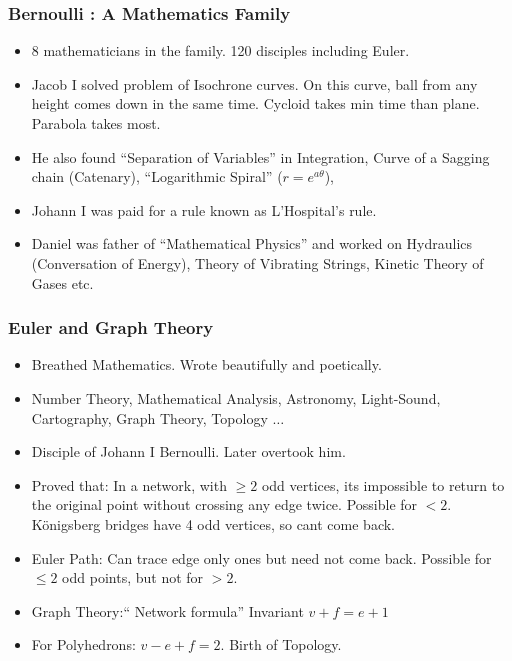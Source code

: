 \begin{frame}[fragile]
\frametitle{Bernoulli : A Mathematics Family}



\begin{itemize}
\item 8 mathematicians in the family. 120 disciples including Euler.
\item Jacob I solved problem of Isochrone curves. On this curve, ball from any height comes down in the same time. Cycloid takes min time than plane. Parabola takes most.
\item He also found ``Separation of Variables'' in Integration, Curve of a Sagging chain (Catenary), ``Logarithmic Spiral'' ($r=e^{a\theta}$),
\item Johann I was paid for a rule known as L'Hospital's rule.
\item Daniel was father of ``Mathematical Physics'' and worked on Hydraulics (Conversation of Energy), Theory of Vibrating Strings, Kinetic Theory of Gases etc.
\end{itemize}
\end{frame}

\begin{frame}[fragile]
\frametitle{Euler and Graph Theory}
\begin{itemize}
\item Breathed Mathematics. Wrote beautifully and poetically. 
\item Number Theory, Mathematical Analysis, Astronomy, Light-Sound, Cartography, Graph Theory, Topology $\ldots$
\item Disciple of Johann I Bernoulli. Later overtook him. 
\item Proved that: In a network, with $ \geq 2$ odd vertices, its impossible to return to the original point without crossing any edge twice. Possible for $< 2$. K\"onigsberg bridges have 4 odd vertices, so cant come back.
\item Euler Path: Can trace edge only ones but need not come back. Possible for $\leq 2$ odd points, but not for $> 2$.
\item Graph Theory:`` Network formula'' Invariant $v + f = e + 1$
\item For Polyhedrons: $v -e + f = 2$. Birth of Topology.
\end{itemize}
\end{frame}

